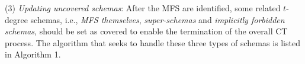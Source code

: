 \documentclass[journal,12pt,onecolumn,draftclsnofoot,]{IEEEtran}
\begin{document}
%

(3) \emph{Updating uncovered schemas}:
After the MFS are identified, some related $t$-degree schemas, i.e., \emph{MFS themselves}, \emph{super-schemas} and \emph{implicitly forbidden schemas}, should be set as covered to enable the termination of the overall CT process. The algorithm that seeks to handle these three types of schemas is listed in Algorithm 1.
\end{document}
